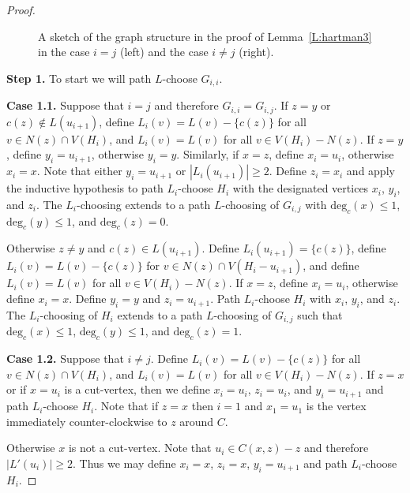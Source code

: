 \documentclass[12pt,letterpaper]{article}
\theoremstyle{plain}
\theoremstyle{definition}
\theoremstyle{break}
\begin{document}
\begin{proof}
\begin{figure}[ht]
\begin{center}
\caption{A sketch of the graph structure in the proof of Lemma~\ref{L:hartman3}
in the case $i=j$ (left) and the case $i\ne j$ (right).}
\label{F:hartman3_abst}
\end{center}
\end{figure}

\textbf{Step 1.} To start we will path $L$-choose $G_{i,i}$.

\textbf{Case 1.1.} Suppose that $i=j$ and therefore
$G_{i,i}=G_{i,j}$. If $z=y$ or $c(z)\not\in L(u_{i+1})$,
define $L_i(v)=L(v)-\{c(z)\}$
for all $v\in N(z)\cap V(H_i)$, and $L_i(v)=L(v)$ for all
$v\in V(H_i)-N(z)$. If $z=y$, define
$y_i=u_{i+1}$, otherwise $y_i=y$. Similarly, if $x=z$, define $x_i=u_i$,
otherwise $x_i=x$. Note that either $y_i=u_{i+1}$ or $|L_i(u_{i+1})|\ge 2$.
Define $z_i=x_i$ and apply the inductive hypothesis to path
$L_i$-choose $H_i$ with the designated vertices $x_i$, $y_i$, and $z_i$.
The $L_i$-choosing
extends to a path $L$-choosing of $G_{i,j}$ with
$\text{deg}_c(x)\le 1$, $\text{deg}_c(y)\le 1$, and $\text{deg}_c(z)=0$.

Otherwise $z\ne y$ and $c(z)\in L(u_{i+1})$. Define
$L_i(u_{i+1})=\{c(z)\}$, define $L_i(v)=L(v)-\{c(z)\}$ for
$v\in N(z)\cap V(H_i-u_{i+1})$, and define $L_i(v)=L(v)$
for all $v\in V(H_i)-N(z)$. If $x=z$, define $x_i=u_i$, otherwise define $x_i=x$.
Define $y_i=y$ and $z_i=u_{i+1}$.
Path $L_i$-choose $H_i$ with
$x_i$, $y_i$, and $z_i$. The $L_i$-choosing of $H_i$ extends to a path
$L$-choosing of $G_{i,j}$ such that $\text{deg}_c(x)\le 1$,
$\text{deg}_c(y)\le 1$, and $\text{deg}_c(z)=1$.

\textbf{Case 1.2.} Suppose that $i\ne j$.
Define $L_i(v)=L(v)-\{c(z)\}$ for all $v\in N(z)\cap V(H_i)$,
and $L_i(v)=L(v)$ for all $v\in V(H_i)-N(z)$. 
If $z=x$ or if $x=u_i$ is a cut-vertex, then we
define $x_i=u_i$, $z_i=u_i$, and $y_i=u_{i+1}$ and path $L_i$-choose $H_i$.
Note that if $z=x$ then $i=1$ and $x_1=u_1$
is the vertex immediately counter-clockwise to $z$ around $C$.

Otherwise $x$ is not a cut-vertex. Note that $u_i\in C(x,z) - z$ and
therefore $|L'(u_i)|\ge 2$. Thus we may define $x_i=x$, $z_i=x$,
$y_i=u_{i+1}$ and path $L_i$-choose $H_i$.


\end{proof}
\end{document}
